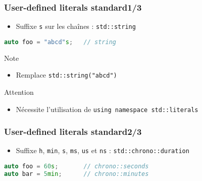 \documentclass[C++.tex]{subfiles}
\begin{document}
\begin{frame}[fragile]
	\frametitle{User-defined literals standard\titlehfill{}1/3}


	\begin{itemize}
		\item Suffixe \lstinline|s| sur les chaînes : \lstinline|std::string|
	\end{itemize}

	\begin{lstlisting}[language=C++]
auto foo = "abcd"s;   // string\end{lstlisting}

	\begin{block}{Note}
		\begin{itemize}
			\item Remplace \lstinline|std::string("abcd")|
		\end{itemize}
	\end{block}

	\begin{alertblock}{Attention}
		\begin{itemize}
			\item Nécessite l'utilisation de \lstinline|using namespace std::literals|
		\end{itemize}


	\end{alertblock}



\end{frame}

\begin{frame}[fragile]
	\frametitle{User-defined literals standard\titlehfill{}2/3}
	\begin{itemize}
		\item Suffixe \lstinline|h|, \lstinline|min|, \lstinline|s|, \lstinline|ms|, \lstinline|us| et \lstinline|ns| : \lstinline|std::chrono::duration|
	\end{itemize}

	\begin{lstlisting}[language=C++]
auto foo = 60s;       // chrono::seconds
auto bar = 5min;      // chrono::minutes\end{lstlisting}
\end{frame}
\end{document}

